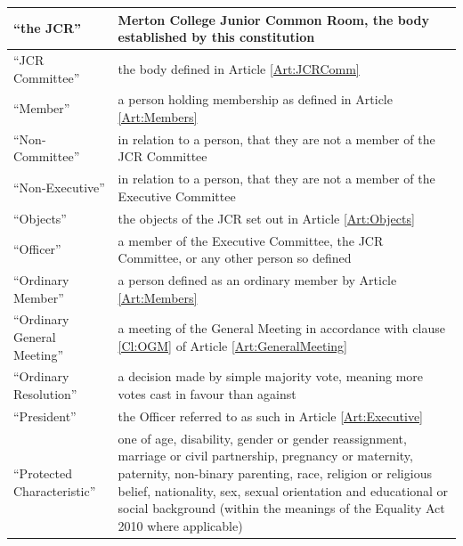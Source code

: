 \documentclass[11pt,a4paper, oneside]{memoir}
\begin{document}
\begin{enumerate}
\begin{longtable}{|p{}|p{}|}
			\\ \hline
			``the JCR''                       & Merton College Junior Common Room, the body established by this constitution
			\\ \hline
			``JCR Committee''                 & the body defined in Article \ref{Art:JCRComm}  
			\\ \hline
			``Member''                        & a person holding membership as defined in Article \ref{Art:Members}
			\\ \hline
			``Non-Committee''                 & in relation to a person, that they are not a member of the JCR Committee
			\\ \hline
			``Non-Executive''                 & in relation to a person, that they are not a member of the Executive Committee
			\\ \hline
			``Objects''                       & the objects of the JCR set out in Article \ref{Art:Objects}
			\\ \hline
			``Officer''                       & a member of the Executive Committee, the JCR Committee, or any other person so defined                                                                                                                                                                                                                                                                                                                                                                               \\ \hline
			``Ordinary Member''               & a person defined as an ordinary member by Article \ref{Art:Members}
			\\ \hline
			``Ordinary General Meeting''      & a meeting of the General Meeting in accordance with clause \ref{Cl:OGM} of Article \ref{Art:GeneralMeeting}
			\\ \hline
			``Ordinary Resolution''           & a decision made by simple majority vote, meaning more votes cast in favour than against
			\\ \hline
			``President''                     & the Officer referred to as such in Article \ref{Art:Executive} 
			\\ \hline
			``Protected Characteristic''      & one of age, disability, gender or gender reassignment, marriage or civil partnership, pregnancy or maternity, paternity, non-binary parenting, race, religion or religious belief, nationality, sex, sexual orientation and educational or social background (within the meanings of the Equality Act 2010 where applicable)

\end{longtable}
\end{enumerate}
\end{document}
